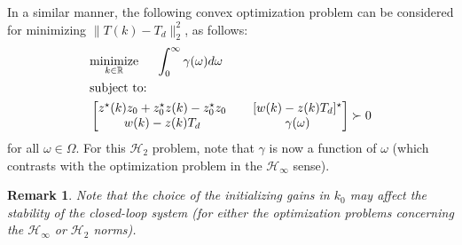 \documentclass[a4paper, 10pt, conference]{ieeeconf}
\newtheorem*{remark}{Remark}
\begin{document}
In a similar manner, the following convex optimization problem can be considered for minimizing  $ \|T(k)- T_d \|_2^2$, as follows:
\begin{equation} \label{eq:loop_shape_LMI_2}
\begin{aligned}
& \underset{ k \in \mathbb{R}}{\text{minimize}} \hspace{0.5cm} \int_0^\infty \gamma(\omega) d\omega  \\
& \text{subject to:} \\
&
\begin{bmatrix}
z^{\star}(k)z_0 + z_0^{\star}z(k) - z_0^{\star}z_0 & \phantom{xx}[w(k)-z(k)T_d]^{\star} \\ 
w(k)-z(k)T_d & \phantom{xx}\gamma(\omega)
\end{bmatrix} \succ 0
\end{aligned}
\end{equation}
for all $\omega \in \Omega$. For this $\mathcal{H}_2$ problem, note that $\gamma$ is now a function of $\omega$ (which contrasts with the optimization problem in the $\mathcal{H}_\infty$ sense). 

\begin{remark}
\textit{Note that the choice of the initializing gains in $k_0$ may affect the stability of the closed-loop system (for either the optimization problems concerning the $\mathcal{H}_\infty$ or $\mathcal{H}_2$ norms). }
\end{remark}
\end{document}
